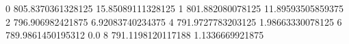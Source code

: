 0 805.8370361328125 15.85089111328125
1 801.882080078125 11.89593505859375
2 796.906982421875 6.92083740234375
4 791.9727783203125 1.98663330078125
6 789.9861450195312 0.0
8 791.1198120117188 1.1336669921875
